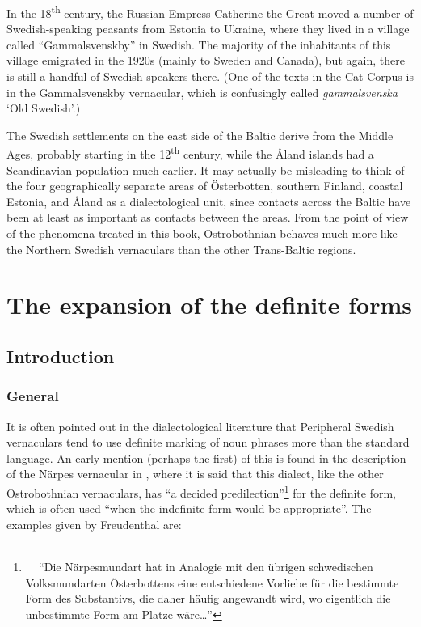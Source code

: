 \begin{styleBodytextC}
In the 18\textsuperscript{th} century, the Russian Empress Catherine the Great moved a number of Swedish-speaking peasants from Estonia to Ukraine, where they lived in a village called “Gammalsvenskby” in Swedish. The majority of the inhabitants of this village emigrated in the 1920s (mainly to Sweden and Canada), but again, there is still a handful of Swedish speakers there. (One of the texts in the Cat Corpus is in the Gammalsvenskby vernacular, which is confusingly called \textit{gammalsvenska} ‘Old Swedish’.)

\end{styleBodytextC}

\begin{styleBodytextC}
The Swedish settlements on the east side of the Baltic derive from the Middle Ages, probably starting in the 12\textsuperscript{th} century, while the Åland islands had a Scandinavian population much earlier. It may actually be misleading to think of the four geographically separate areas of Österbotten, southern Finland, coastal Estonia, and Åland as a dialectological unit, since contacts across the Baltic have been at least as important as contacts between the areas. From the point of view of the phenomena treated in this book, Ostrobothnian behaves much more like the Northern Swedish vernaculars than the other Trans-Baltic regions.

\end{styleBodytextC}

\chapter[The expansion of the definite forms]{\rmfamily\bfseries The expansion of the definite forms}
\label{bkm:Ref160007852}\label{bkm:Ref156803843}\label{bkm:Ref155077895}\section{\rmfamily\bfseries Introduction}
\subsection{\rmfamily General}

\begin{styleBodyTextFirst}
It is often pointed out in the dialectological literature that Peripheral Swedish vernaculars tend to use definite marking of noun phrases more than the standard language. An early mention (perhaps the first) of this is found in the description of the Närpes vernacular in \citet[137]{Freudenthal1878}, where it is said that this dialect, like the other Ostrobothnian vernaculars, has “a decided predilection”\footnote{\textsuperscript{\ \ } “Die Närpesmundart hat in Analogie mit den übrigen schwedischen Volksmundarten Österbottens eine entschiedene Vorliebe für die bestimmte Form des Substantivs, die daher häufig angewandt wird, wo eigentlich die unbestimmte Form am Platze wäre…”} for the definite form, which is often used “when the indefinite form would be appropriate”. The examples given by Freudenthal are:

\end{styleBodyTextFirst}

